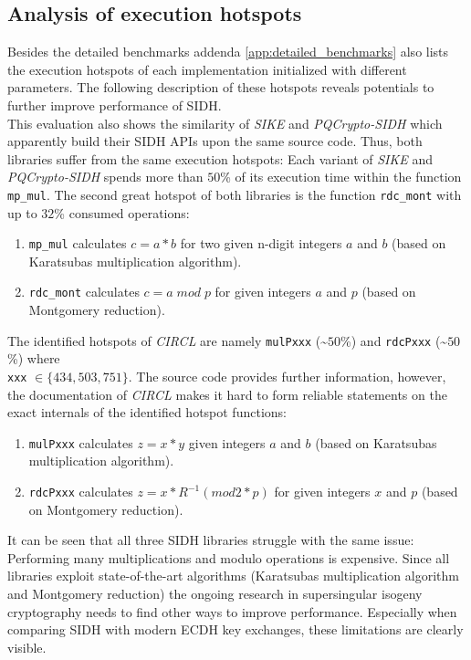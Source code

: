 \subsection{Analysis of execution hotspots}\label{sec:analysis_sidh_hotspots}
Besides the detailed benchmarks addenda \ref{app:detailed_benchmarks} also lists the execution hotspots of each implementation initialized with different parameters. The following description of these hotspots reveals potentials to further improve performance of \gls{SIDH}.\\
This evaluation also shows the similarity of \textit{SIKE} and \textit{ \gls{PQCrypto-SIDH}} which apparently build their \gls{SIDH} APIs upon the same source code. Thus, both libraries suffer from the same execution hotspots: Each variant of \textit{SIKE} and \textit{ \gls{PQCrypto-SIDH}} spends more than $50$\% of its execution time within the function \texttt{mp\_mul}. The second great hotspot of both libraries is the function \texttt{rdc\_mont} with up to $32$\% consumed operations:
\begin{enumerate}
\item \texttt{mp\_mul} calculates $c=a*b$ for two given n-digit integers $a$ and $b$ (based on Karatsubas multiplication algorithm).
\item \texttt{rdc\_mont} calculates $c = a\;mod\;p$ for given integers $a$ and $p$ (based on Montgomery reduction).
\end{enumerate}
The identified hotspots of \textit{\gls{CIRCL}} are namely \texttt{mulPxxx} (\textasciitilde $50$\%) and \texttt{rdcPxxx} (\textasciitilde $50$\%) where \\\texttt{xxx} $\in \{434, 503, 751\}$. The source code provides further information, however, the documentation of \textit{\gls{CIRCL}} makes it hard to form reliable statements on the exact internals of the identified hotspot functions:
\begin{enumerate}
\item \texttt{mulPxxx} calculates $z=x*y$ given integers $a$ and $b$ (based on Karatsubas multiplication algorithm).
\item \texttt{rdcPxxx} calculates $z = x*R^{-1} (mod 2*p)$ for given integers $x$ and $p$ (based on Montgomery reduction).
\end{enumerate}
It can be seen that all three \gls{SIDH} libraries struggle with the same issue: Performing many multiplications and modulo operations is expensive. Since all libraries exploit state-of-the-art algorithms (Karatsubas multiplication algorithm and Montgomery reduction) the ongoing research in supersingular isogeny cryptography needs to find other ways to improve performance. Especially when comparing \gls{SIDH} with modern \gls{ECDH} key exchanges, these limitations are clearly visible.

